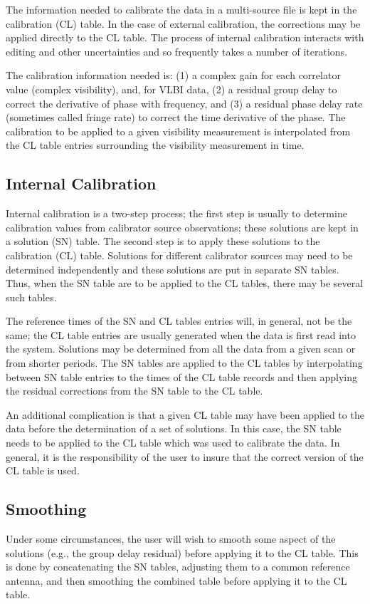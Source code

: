 The information needed to calibrate the data in a multi-source file is
kept in the calibration (CL) table.  In the case of external
calibration, the corrections may be applied directly to the CL table.
The process of internal calibration interacts with editing and other
uncertainties and so frequently takes a number of iterations.

The calibration information needed is: (1) a complex gain for each
correlator value (complex visibility), and, for VLBI data, (2) a
residual group delay to correct the derivative of phase with
frequency, and (3) a residual phase delay rate (sometimes called
fringe rate) to correct the time derivative of the phase.  The
calibration to be applied to a given visibility measurement is
interpolated from the CL table entries surrounding the visibility
measurement in time.

\subsection{Internal Calibration }
Internal calibration is a two-step process; the first step is usually
to determine calibration values from calibrator source observations;
these solutions are kept in a solution (SN) table. The second step is
to apply these solutions to the calibration (CL) table. Solutions for
different calibrator sources may need to be determined independently
and these solutions are put in separate SN tables. Thus, when the SN
table are to be applied to the CL tables, there may be several such
tables.

The reference times of the SN and CL tables entries will, in general,
not be the same;  the CL table entries are usually generated when the
data is first read into the system.  Solutions may be determined from
all the data from a given scan or from shorter periods. The SN tables
are applied to the CL tables by interpolating between SN table entries
to the times of the CL table records and then applying the residual
corrections from the SN table to the CL table.

An additional complication is that a given CL table may have been
applied to the data before the determination of a set of solutions. In
this case, the SN table needs to be applied to the CL table which was
used to calibrate the data.  In general, it is the responsibility of
the user to insure that the correct version of the CL table is used.

\subsection{Smoothing }
Under some circumstances, the user will wish to smooth some aspect of
the solutions (e.g., the group delay residual) before applying it to
the CL table.  This is done by concatenating the SN tables, adjusting
them to a common reference antenna, and then smoothing the combined
table before applying it to the CL table.

